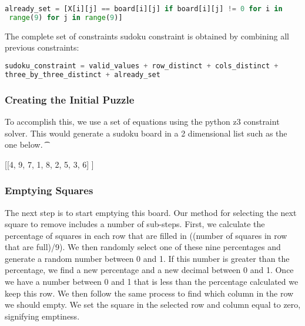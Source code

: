 \singlespace
\begin{lstlisting}[language=python, frame = single]
 already_set = [X[i][j] == board[i][j] if board[i][j] != 0 for i in
 range(9) for j in range(9)]

\end{lstlisting}
\doublespace

The complete set of constraints sudoku constraint is obtained by
combining all previous constraints:

\singlespace
\begin{lstlisting}[language=python, frame = single]
sudoku_constraint = valid_values + row_distinct + cols_distinct +
three_by_three_distinct + already_set
\end{lstlisting}
\doublespace


\subsubsection{Creating the Initial Puzzle}
To accomplish this, we use a set of equations using the python z3 constraint solver. This would generate a sudoku board in a 2 dimensional list such as the one
below. 
\t{
\singlespace
\begin{center}
[[4, 9, 7, 1, 8, 2, 5, 3, 6] \newline
[1, 5, 2, 3, 6, 4, 8, 9, 7] \newline
[8, 6, 3, 5, 7, 9, 4, 1, 2] \newline
[7, 3, 4, 6, 9, 1, 2, 5, 8] \newline
[2, 8, 9, 4, 3, 5, 7, 6, 1] \newline
[5, 1, 6, 7, 2, 8, 9, 4, 3] \newline
[3, 2, 5, 9, 1, 7, 6, 8, 4] \newline
[9, 7, 1, 8, 4, 6, 3, 2, 5] \newline
[6, 4, 8, 2, 5, 3, 1, 7, 9]] \newline
\end{center}}
\doublespace

\subsubsection{Emptying Squares}

The next step is to start emptying this board. Our method for
selecting the next square to remove includes a number of
sub-steps. First, we calculate the percentage of squares in each row that are filled in ((number of squares in row that are full)/9). We then randomly
select one of these nine percentages and generate a random number between 0
and 1. If this number is greater than the percentage, we find a new
percentage and a new decimal between 0 and 1. Once we have a number
between 0 and 1 that is less than the percentage calculated we keep
this row. We then follow the same process to find which column in the
row we should empty. We set the square in the selected row and column
equal to zero, signifying emptiness.


